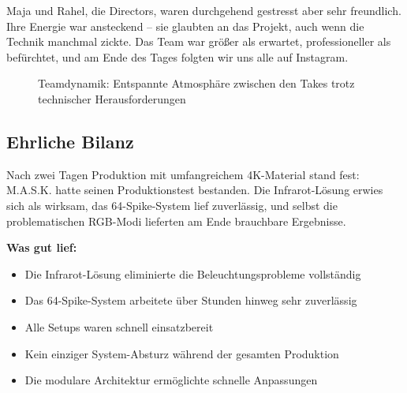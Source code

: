 Maja und Rahel, die Directors, waren durchgehend gestresst aber sehr freundlich. Ihre Energie war ansteckend – sie glaubten an das Projekt, auch wenn die Technik manchmal zickte. Das Team war größer als erwartet, professioneller als befürchtet, und am Ende des Tages folgten wir uns alle auf Instagram.

\begin{figure}[htbp]
    \centering
    \caption{Teamdynamik: Entspannte Atmosphäre zwischen den Takes trotz technischer Herausforderungen}
    \label{fig:team_atmosphere}
\end{figure}

\newpage



\clearpage
\subsection{Ehrliche Bilanz}

Nach zwei Tagen Produktion mit umfangreichem 4K-Material stand fest: M.A.S.K. hatte seinen Produktionstest bestanden. Die Infrarot-Lösung erwies sich als wirksam, das 64-Spike-System lief zuverlässig, und selbst die problematischen RGB-Modi lieferten am Ende brauchbare Ergebnisse.

\textbf{Was gut lief:}
\begin{itemize}
   \item Die Infrarot-Lösung eliminierte die Beleuchtungsprobleme vollständig
   \item Das 64-Spike-System arbeitete über Stunden hinweg sehr zuverlässig
   \item Alle Setups waren schnell einsatzbereit
   \item Kein einziger System-Absturz während der gesamten Produktion
   \item Die modulare Architektur ermöglichte schnelle Anpassungen
\end{itemize}

